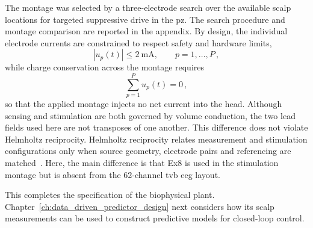 The montage was selected by a three-electrode search over the available scalp locations for targeted suppressive drive in the \ac{pz}.
The search procedure and montage comparison are reported in the appendix.
By design, the individual electrode currents are constrained to respect safety and hardware limits,
%
\begin{equation*}
    |u_p(t)|\leq\SI{2}{\milli\ampere},
    \qquad p=1,\ldots,P\,,
\end{equation*}
%
while charge conservation across the montage requires
%
\begin{equation*}
    \sum_{p=1}^{P}u_p(t)=0\,,
\end{equation*}
%
so that the applied montage injects no net current into the head.
Although sensing and stimulation are both governed by volume conduction, the two lead fields used here are not transposes of one another.
This difference does not violate Helmholtz reciprocity.
Helmholtz reciprocity relates measurement and stimulation configurations only when source geometry, electrode pairs and referencing are matched~\cite{Malmivuo1995}. %
Here, the main difference is that Ex8 is used in the stimulation montage but is absent from the 62-channel \ac{tvb} \ac{eeg} layout.

This completes the specification of the biophysical plant. Chapter~\ref{ch:data_driven_predictor_design} next considers how its scalp measurements can be used to construct predictive models for closed-loop control.
